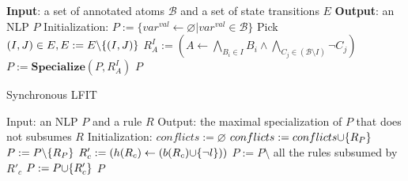 \begin{algorithm}[ht]
\begin{algorithmic}
    \State \textbf{Input}: a set of annotated atoms $\mathcal{B}$ and a set of state transitions $E$
    \State \textbf{Output}: an NLP $P$
    \State Initialization: $P:= \{var^{val}\gets\varnothing|var^{val}\in \mathcal{B}\}$
        \State Pick $(I,J)\in E,E:= E \miset{(I,J)}$
            \State $R_A^I:= (A\gets\underset{B_i\in I}{\bigwedge}B_i\land \underset{C_j\in (\mathcal{B}\setminus I)}{\bigwedge}\lnot C_j)$
            \State $P:= \mathbf{Specialize}(P,R_A^I)$
        \EndFor
    \EndWhile
    \State\Return $P$
\end{algorithmic}
\caption{Synchronous LFIT}\label{alg:syncLFIT}
\end{algorithm}

\begin{algorithm}[ht]
\begin{algorithmic}
    \State Input: an NLP $P$ and a rule $R$
    \State Output: the maximal specialization of $P$ that does not subsumes $R$
    \State Initialization: $conflicts := \varnothing$
    \State{\textcolor{gray}{// Search rules that need to be specialized}}
            \State $conflicts := conflicts\addset{R_P}$
            \State $P := P \miset{R_P} $
        \EndIf
    \EndFor
    \State{\textcolor{gray}{// Revise the rules by least specialization}}
                \State $R'_c:= (h(R_c) \gets (b(R_c) \addset{\lnot l}))$
                    \State $P := P \setminus$ all the rules subsumed by $R'_c$
                    \State $P := P \addset{ R'_c}$
                \EndIf
            \EndIf
        \EndFor
    \EndFor
    \State\Return $P$
\end{algorithmic}
\caption{\textbf{Specialize} in synchronous LFIT algorithm%
}\label{alg:specializeLFIT}
\end{algorithm}


